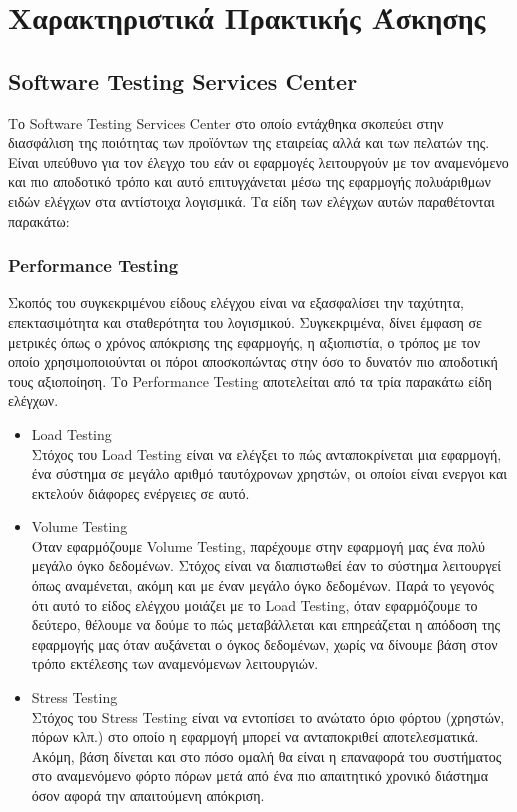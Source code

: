 \chapter{Χαρακτηριστικά Πρακτικής Άσκησης}

\section{Software Testing Services Center}

Το Software Testing Services Center στο οποίο εντάχθηκα σκοπεύει στην διασφάλιση της ποιότητας των προϊόντων της εταιρείας αλλά και των πελατών της. Είναι υπεύθυνο για τον έλεγχο του εάν οι εφαρμογές λειτουργούν με τον αναμενόμενο και πιο αποδοτικό τρόπο και αυτό επιτυγχάνεται μέσω της εφαρμογής πολυάριθμων ειδών ελέγχων στα αντίστοιχα λογισμικά. Τα είδη των ελέγχων αυτών παραθέτονται παρακάτω:\\

\subsection*{Performance Testing}
Σκοπός του συγκεκριμένου είδους ελέγχου είναι να εξασφαλίσει την ταχύτητα, επεκτασιμότητα και σταθερότητα του λογισμικού. Συγκεκριμένα, δίνει έμφαση σε μετρικές όπως ο χρόνος απόκρισης της εφαρμογής, η αξιοπιστία, ο τρόπος με τον οποίο χρησιμοποιούνται οι πόροι αποσκοπώντας στην όσο το δυνατόν πιο αποδοτική τους αξιοποίηση. Το Performance Testing αποτελείται από τα τρία παρακάτω είδη ελέγχων.

\begin{itemize}
    \item Load Testing\\
    Στόχος του Load Testing είναι να ελέγξει το πώς ανταποκρίνεται μια εφαρμογή, ένα σύστημα σε μεγάλο αριθμό ταυτόχρονων χρηστών, οι οποίοι είναι ενεργοι και εκτελούν διάφορες ενέργειες σε αυτό.
    \item Volume Testing\\
    Όταν εφαρμόζουμε Volume Testing, παρέχουμε στην εφαρμογή μας ένα πολύ μεγάλο όγκο δεδομένων. Στόχος είναι να διαπιστωθεί έαν το σύστημα λειτουργεί όπως αναμένεται, ακόμη και με έναν μεγάλο όγκο δεδομένων. Παρά το γεγονός ότι αυτό το είδος ελέγχου μοιάζει με το Load Testing, όταν εφαρμόζουμε το δεύτερο, θέλουμε να δούμε το πώς μεταβάλλεται και επηρεάζεται η απόδοση της εφαρμογής μας όταν αυξάνεται ο όγκος δεδομένων, χωρίς να δίνουμε βάση στον τρόπο εκτέλεσης των αναμενόμενων λειτουργιών.
    \item Stress Testing\\
    Στόχος του Stress Testing είναι να εντοπίσει το ανώτατο όριο φόρτου (χρηστών, πόρων κλπ.) στο οποίο η εφαρμογή μπορεί να ανταποκριθεί αποτελεσματικά. Ακόμη, βάση δίνεται και στο πόσο ομαλή θα είναι η επαναφορά του συστήματος στο αναμενόμενο φόρτο πόρων μετά από ένα πιο απαιτητικό χρονικό διάστημα όσον αφορά την απαιτούμενη απόκριση.
\end{itemize}

